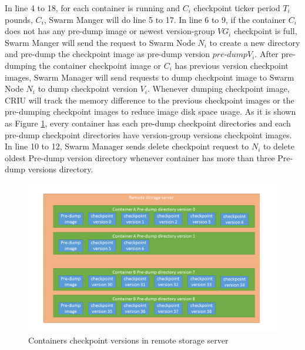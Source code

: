 In line 4 to 18, for each container is running and $C_i$ checkpoint ticker period $T_i$ pounds, $C_i$, Swarm Manger will do line 5 to 17.
In line 6 to 9, if the container $C_i$ does not has any pre-dump image or newest version-group $VG_i$ checkpoint is full, Swarm Manger will send the request to Swarm Node $N_i$ to create a new directory and pre-dump the checkpoint image as pre-dump version $pre$-$dump V_i$.
After pre-dumping the container checkpoint image or $C_i$ has previous version checkpoint images, Swarm Manager will send requests to dump checkpoint image to Swarm Node $N_i$ to dump checkpoint version $V_i$. Whenever dumping checkpoint image, CRIU will track the memory difference to the previous checkpoint images or the pre-dumping checkpoint images to reduce image disk space usage.
As it is shown as Figure \ref{fig:Containers checkpoint versions in remote storage server}, every container has each pre-dump checkpoint directories and each pre-dump checkpoint directories have version-group versions checkpoint images.
In line 10 to 12, Swarm Manager sends delete checkpoint request to $N_i$ to delete oldest Pre-dump version directory whenever container has more than three Pre-dump versions directory.

\begin{figure}[h]
\begin{center}
\includegraphics[width=15cm]{figure/checkpoint_demo.png}
\end{center}
\caption{Containers checkpoint versions in remote storage server}
\label{fig:Containers checkpoint versions in remote storage server}
\end{figure}

